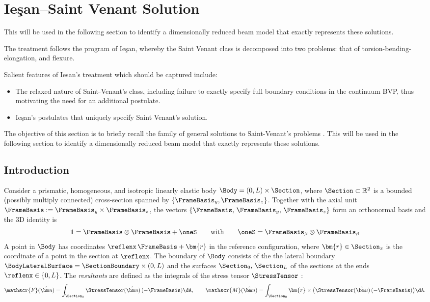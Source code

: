 
\section{Ie\c{s}an--Saint Venant Solution}\label{sec:sv}

\begin{Quote}
This will be used in the following section to identify a dimensionally reduced beam model that exactly represents these solutions.

The treatment follows the program of Ie\c{s}an, whereby the Saint Venant class is decomposed into two problems: that of torsion-bending-elongation, and flexure.

Salient features of Iesan's treatment which should be captured include:
\begin{itemize}
    \item The relaxed nature of Saint-Venant's class, including failure to exactly specify full boundary conditions in the continuum BVP, thus motivating the need for an additional postulate.
    \item Ie\c{s}an's postulates that uniquely specify Saint Venant's solution.
\end{itemize}
\end{Quote}
The objective of this section is to briefly recall the family of general solutions to Saint-Venant's problems \citep{iesan1987saintvenants,synge1945problem}. 
This will be used in the following section to identify a dimensionally reduced beam model that exactly represents these solutions.

\subsection{Introduction}

Consider a prismatic, homogeneous, and isotropic linearly elastic body 
\(
\Body=(0,L)\times\Section
\),
where \(\Section\subset\mathbb{R}^2\) is a bounded (possibly multiply connected) cross-section
spanned by \(\{\FrameBasis_y,\FrameBasis_z\}\). 
Together with the axial unit \(\FrameBasis:= \FrameBasis_y\times\FrameBasis_z\), the vectors \(\{\FrameBasis,\,\FrameBasis_y,\,\FrameBasis_z\}\) form an orthonormal basis and the 3D identity is 
\[
\mathbf{1}=\FrameBasis\otimes\FrameBasis+\oneS
\qquad\text{with}\qquad
\oneS=\FrameBasis_{\beta}\otimes\FrameBasis_{\beta}
\]
A point in \(\Body\) has coordinates \(\reflenx\,\FrameBasis + \bm{r}\) in the reference configuration, where \(\bm{r} \in\Section_x\) is the coordinate of a point in the section at \(\reflenx\).
The boundary of \(\Body\) consists of the the lateral boundary \(\BodyLateralSurface=\SectionBoundary\times(0,L)\) and the surfaces \(\Section_0,\,\Section_L\) of the sections at the ends \(\reflenx \in \{0,L\}\).  The \emph{resultants} are defined as the integrals of the stress tensor \(\StressTensor\;\):
\begin{equation}
\mathscr{F}(\hat{\bm u})=\int_{\Section_0}\StressTensor(\hat{\bm u})\,(-\FrameBasis)\dA,\qquad
\mathscr{M}(\hat{\bm u})=\int_{\Section_0}\bm{r}\times\big(\StressTensor(\hat{\bm u})\,(-\FrameBasis)\big)\dA.
\label{eq:def-resultants}
\end{equation}

